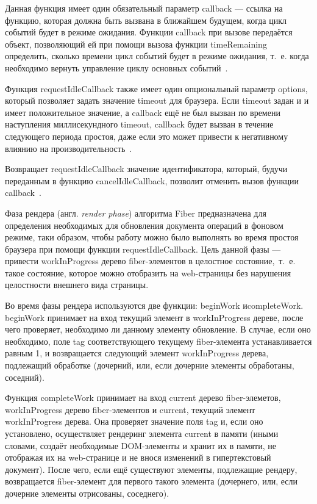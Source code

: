 Данная функция имеет один обязательный параметр callback --- ссылка на функцию, которая должна быть вызвана в ближайшем будущем, когда цикл событий будет в режиме ожидания. 
Функции callback при вызове передаётся объект, позволяющий ей при помощи вызова функции timeRemaining определить, сколько времени цикл событий будет в режиме ожидания, т.~е. когда необходимо вернуть управление циклу основных событий~\cite{requestidlecallback-time-remaining}.

Функция requestIdleCallback также имеет один опциональный параметр options, который позволяет задать значение timeout для браузера.
Если timeout задан и и имеет положительное значение, а callback ещё не был вызван по времени наступления миллисекундного timeout, callback будет вызван в течение следующего периода простоя, даже если это может привести к негативному влиянию на производительность~\cite{requestidlecallback-mdn}.

Возвращает requestIdleCallback значение идентификатора, который, будучи переданным в функцию cancelIdleCallback, позволит отменить вызов функции callback~\cite{requestidlecallback-recommended}.


Фаза рендера (англ. \textit{render phase}) алгоритма Fiber предназначена для определения необходимых для обновления документа операций в фоновом режиме, таки образом, чтобы работу можно было выполнять во время простоя браузера при помощи функции requestIdleCallback. Цель данной фазы --- привести workInProgress дерево fiber-элементов в целостное состояние,~т.~е. такое состояние, которое можно отобразить на web-страницы без нарушения целостности внешнего вида страницы.

Во время фазы рендера используются две функции: beginWork и\linebreak completeWork. beginWork принимает на вход текущий элемент в workInProgress дереве, после чего проверяет, необходимо ли данному элементу обновление. В случае, если оно необходимо, поле tag соответствующего текущему fiber-элемента устанавливается равным 1, и возвращается следующий элемент \linebreak workInProgress дерева, подлежащий обработке (дочерний, или, если дочерние элементы обработаны, соседний).

Функция completeWork принимает на вход current дерево fiber-элеметов, workInProgress дерево fiber-элементов и current, текущий элемент workInProgress дерева. Она проверяет значение поля tag и, если оно установлено, осуществляет рендеринг элемента current в памяти (иными словами, создаёт необходимые DOM-элементы и хранит их в памяти, не отображая их на web-странице и не внося изменений в гипертекстовый документ). После чего, если ещё существуют элементы, подлежащие рендеру, возвращается fiber-элемент для первого такого элемента (дочернего, или, если дочерние элементы отрисованы, соседнего).

